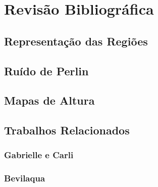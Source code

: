 \chapter{Revisão Bibliográfica}

\section{Representação das Regiões}

\section{Ruído de Perlin}

\section{Mapas de Altura}

\section{Trabalhos Relacionados}

\subsection{Gabrielle e Carli}

\subsection{Bevilaqua}